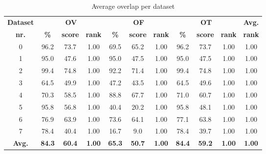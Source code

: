 \begin{table*}
\scriptsize
\caption{Average overlap per dataset}
\centering
\begin{tabular}{|c|ccc|ccc|ccc|c|}
\hline
\multicolumn{1}{|c|}{\textbf{Dataset}} &\multicolumn{3}{c|}{\textbf{OV}} &\multicolumn{3}{c|}{\textbf{OF}} &\multicolumn{3}{c|}{\textbf{OT}} &\multicolumn{1}{c|}{\textbf{Avg.}} \\
\multicolumn{1}{|c|}{\textbf{nr.}} &\multicolumn{1}{c|}{\textbf{\%}} &\multicolumn{1}{c|}{\textbf{score}} &\multicolumn{1}{c|}{\textbf{rank}} &\multicolumn{1}{c|}{\textbf{\%}} &\multicolumn{1}{c|}{\textbf{score}} &\multicolumn{1}{c|}{\textbf{rank}} &\multicolumn{1}{c|}{\textbf{\%}} &\multicolumn{1}{c|}{\textbf{score}} &\multicolumn{1}{c|}{\textbf{rank}} &\multicolumn{1}{c|}{\textbf{rank}}\\
\hline
0&96.2&73.7& 1.00&69.5&65.2& 1.00&96.2&73.7& 1.00& 1.00\\
1&95.0&47.6& 1.00&95.0&47.5& 1.00&95.0&47.5& 1.00& 1.00\\
2&99.4&74.8& 1.00&92.2&71.4& 1.00&99.4&74.8& 1.00& 1.00\\
3&64.5&49.9& 1.00&47.2&43.5& 1.00&64.5&49.6& 1.00& 1.00\\
4&70.3&58.5& 1.00&88.8&67.7& 1.00&71.0&60.7& 1.00& 1.00\\
5&95.8&56.8& 1.00&40.4&20.2& 1.00&95.8&48.1& 1.00& 1.00\\
6&76.9&63.9& 1.00&73.6&64.1& 1.00&77.1&63.8& 1.00& 1.00\\
7&78.4&40.4& 1.00&16.7&9.0& 1.00&78.4&39.7& 1.00& 1.00\\
\hline
\textbf{Avg.}&\textbf{84.3}&\textbf{60.4}&\textbf{ 1.00}&\textbf{65.3}&\textbf{50.7}&\textbf{ 1.00}&\textbf{84.4}&\textbf{59.2}&\textbf{ 1.00}&\textbf{ 1.00}\\
\hline
\end{tabular}
\vspace{-0.3cm}
\label{}
\normalsize
\end{table*}

